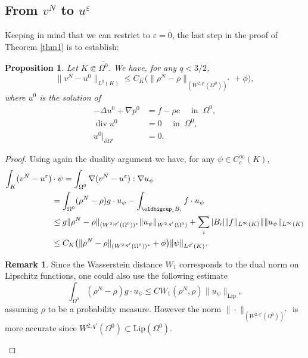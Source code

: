 \documentclass[JEP,XML,SOM,Unicode,NoEqCountersInSection,published]{cedram}
\renewcommand{\div}{\operatorname{div}}
\theoremstyle{plain}
\newtheorem{prop}[thm]{Proposition}
\theoremstyle{definition}
\newtheorem{rem}{Remark}[section]
\let\pa\partial
\let\na\nabla
\let\eps\varepsilon
\newcommand{\Lip}{\mathrm{Lip}}
\begin{document}
\subsection{From $v^N$ to $u^\varepsilon$}
Keeping in mind that we can restrict to $\eps = 0$, the last step in the proof of Theorem \ref{thm1} is to establish:
\begin{prop}
Let $K \Subset \overline{\Omega^0}$. We have, for any $q<3/2$,\vspace*{-3pt}
\[
\|v^N-u^0\|_{L^q(K)} \leq C_{K} \big(\|{\rho}^N-\rho\|_{(W^{2,q'}(\Omega^0))^*} + \phi \big),
\]
where $u^0$ is the solution of\vspace*{-3pt}
\begin{equation*}
\begin{aligned}
-\Delta u^0 + \na p^0 & = f - \rho e \quad \text{ in } \: \Omega^0, \\
\div u^0 & = 0 \quad \text{ in } \: \Omega^0,\\
u^0 \vert_{\pa \Omega^\eps} & = 0.
\end{aligned}
\end{equation*}
\end{prop}
\begin{proof}
Using again the duality argument we have, for any $\psi \in C^\infty_c(K)$,\vspace*{-3pt}
\begin{align*}
\int_K (v^N-u^\varepsilon)&{}\cdot \psi = \int_{\Omega^0} \nabla (v^N-u^\varepsilon): \nabla u_\psi \\
&= \int_{\Omega^0} ({\rho}^N-\rho) g \cdot u_\psi - \int_{\oldbigcup_i B_i} f \cdot u_\psi \\
&\leq g \|{\rho}^N-\rho\|_{(W^{2,q'}(\Omega^0))^*} \| u_\psi \|_{W^{2,q'}(\Omega^0)} + \sum_i |B_i| \|f\|_{L^\infty(K)} \|\| u_\psi \|_{L^\infty(K)}\\
&\leq C_{K} \big(\|{\rho}^N-\rho\|_{(W^{2,q'}(\Omega^0))^*} + \phi \big) \|\psi\|_{L^{q'}(K)}.
\end{align*}
\begin{rem} \label{rem:Wasserstein_versus_sob_neg}
Since the Wasserstein distance $W_1$ corresponds to the dual norm on Lipschitz functions, one could also use the following estimate
\[
\int_{\Omega^0} ({\rho}^N-\rho) g \cdot u_\psi \leq C W_1(\rho^N,\rho) \|u_\psi\|_{\Lip},
\]
assuming $\rho$ to be a probability measure. However the norm $\| \cdot \|_{(W^{2,q'}(\Omega^0))^*} $ is more accurate since $ W^{2,q'}(\Omega^0)\subset \Lip(\Omega^0)$.\qedhere
\end{rem}
\end{proof}
\end{document}
